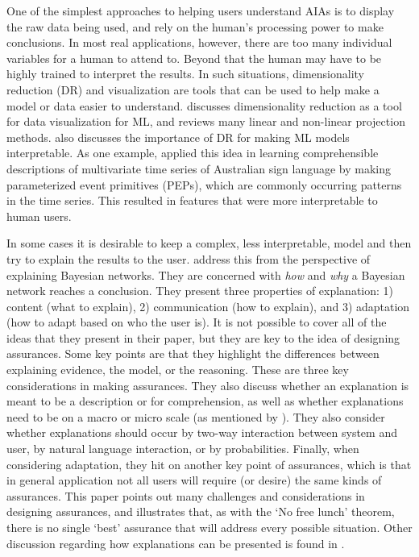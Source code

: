     One of the simplest approaches to helping users understand AIAs is to display the raw data being used, and rely on the human's processing power to make conclusions. In most real applications, however, there are too many individual variables for a human to attend to. Beyond that the human may have to be highly trained to interpret the results. In such situations, dimensionality reduction (DR) and visualization are tools that can be used to help make a model or data easier to understand. \citet{Venna2007-yj} discusses dimensionality reduction as a tool for data visualization for ML, and reviews many linear and non-linear projection methods. \citet{Vellido2012-nm} also discusses the importance of DR for making ML models interpretable. As one example, \citet{Kadous1999-rx} applied this idea in learning comprehensible descriptions of multivariate time series of Australian sign language by making parameterized event primitives (PEPs), which are commonly occurring patterns in the time series. This resulted in features that were more interpretable to human users.

    In some cases it is desirable to keep a complex, less interpretable, model and then try to explain the results to the user. \citet{Lacave2002-cu} address this from the perspective of explaining Bayesian networks. They are concerned with \emph{how} and \emph{why} a Bayesian network reaches a conclusion. They present three properties of explanation: 1) content (what to explain), 2) communication (how to explain), and 3) adaptation (how to adapt based on who the user is). It is not possible to cover all of the ideas that they present in their paper, but they are key to the idea of designing assurances. Some key points are that they highlight the differences between explaining evidence, the model, or the reasoning. These are three key considerations in making assurances. They also discuss whether an explanation is meant to be a description or for comprehension, as well as whether explanations need to be on a macro or micro scale (as mentioned by \citeauthor{Ruping2006-xj}). They also consider whether explanations should occur by two-way interaction between system and user, by natural language interaction, or by probabilities. Finally, when considering adaptation, they hit on another key point of assurances, which is that in general application not all users will require (or desire) the same kinds of assurances. This paper points out many challenges and considerations in designing assurances, and illustrates that, as with the `No free lunch' theorem, there is no single `best' assurance that will address every possible situation. Other discussion regarding how explanations can be presented is found in \cite{Rouse1986-dz,Wallace2001-fm,Kuhn1997-qc,Lomas2012-ie,Swartout1983-ko}.

